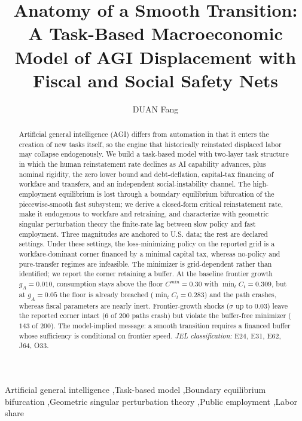 \documentclass[review,12pt]{elsarticle}
\theoremstyle{plain}
\theoremstyle{definition}
\theoremstyle{remark}
\begin{document}
\begin{frontmatter}

\title{Anatomy of a Smooth Transition: A Task-Based Macroeconomic Model of AGI Displacement with Fiscal and Social Safety Nets}

\author[addr1]{DUAN Fang}
\address[addr1]{Huaqiao University, School of Information Science and Engineering, Xiamen, China}

\begin{abstract}
Artificial general intelligence (AGI) differs from automation in that it enters the creation of new tasks itself, so the engine that historically reinstated displaced labor may collapse endogenously. We build a task-based model with two-layer task structure in which the human reinstatement rate declines as AI capability advances, plus nominal rigidity, the zero lower bound and debt-deflation, capital-tax financing of workfare and transfers, and an independent social-instability channel. The high-employment equilibrium is lost through a boundary equilibrium bifurcation of the piecewise-smooth fast subsystem; we derive a closed-form critical reinstatement rate, make it endogenous to workfare and retraining, and characterize with geometric singular perturbation theory the finite-rate lag between slow policy and fast employment. Three magnitudes are anchored to U.S. data; the rest are declared settings. Under these settings, the loss-minimizing policy on the reported grid is a workfare-dominant corner financed by a minimal capital tax, whereas no-policy and pure-transfer regimes are infeasible. The minimizer is grid-dependent rather than identified; we report the corner retaining a buffer. At the baseline frontier growth $g_A=0.010$, consumption stays above the floor $C^{min}=0.30$ with $\min_t C_t=0.309$, but at $g_A=0.05$ the floor is already breached ($\min_tC_t=0.283$) and the path crashes, whereas fiscal parameters are nearly inert. Frontier-growth shocks ($\sigma$ up to $0.03$) leave the reported corner intact ($6$ of $200$ paths crash) but violate the buffer-free minimizer ($143$ of $200$). The model-implied message: a smooth transition requires a financed buffer whose sufficiency is conditional on frontier speed.
\vspace{6pt}\noindent\textit{JEL classification:} E24, E31, E62, J64, O33.
\end{abstract}

\begin{keyword}
Artificial general intelligence \sep Task-based model \sep Boundary equilibrium bifurcation \sep Geometric singular perturbation theory \sep Public employment \sep Labor share
\end{keyword}

\end{frontmatter}
\end{document}
